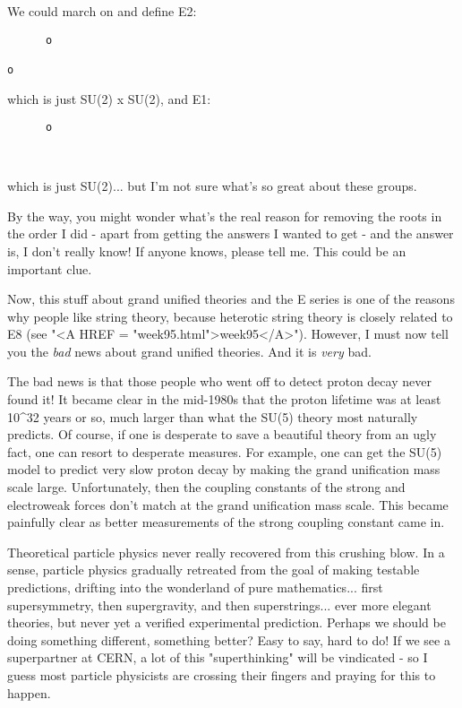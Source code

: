 We could march on and define E2:

\begin{verbatim}
      o      
            
o

\end{verbatim}
    
which is just SU(2) x SU(2), and E1:

\begin{verbatim}
      o      
            


\end{verbatim}
    
which is just SU(2)... but I'm not sure what's so great about these
groups.  

By the way, you might wonder what's the real reason for removing the
roots in the order I did - apart from getting the answers I wanted to
get - and the answer is, I don't really know!  If anyone knows, please
tell me.  This could be an important clue.

Now, this stuff about grand unified theories and the E series is one
of the reasons why people like string theory, because heterotic string
theory is closely related to E8 (see "<A HREF =
"week95.html">week95</A>").  However, I must now tell you the
\emph{bad} news about grand unified theories.  And it is \emph{very} bad.

The bad news is that those people who went off to detect proton
decay never found it!  It became clear in the mid-1980s that the
proton lifetime was at least 10^{32} years or so, much larger than
what the SU(5) theory most naturally predicts.  Of course, if one is
desperate to save a beautiful theory from an ugly fact, one can resort
to desperate measures.  For example, one can get the SU(5) model to
predict very slow proton decay by making the grand unification mass
scale large.  Unfortunately, then the coupling constants of the strong
and electroweak forces don't match at the grand unification mass
scale.  This became painfully clear as better measurements of the
strong coupling constant came in.

Theoretical particle physics never really recovered from this crushing
blow.  In a sense, particle physics gradually retreated from the goal
of making testable predictions, drifting into the wonderland of pure
mathematics... first supersymmetry, then supergravity, and then
superstrings... ever more elegant theories, but never yet a verified
experimental prediction.  Perhaps we should be doing something
different, something better?  Easy to say, hard to do!  If we see a
superpartner at CERN, a lot of this "superthinking" will be
vindicated - so I guess most particle physicists are crossing their
fingers and praying for this to happen.

